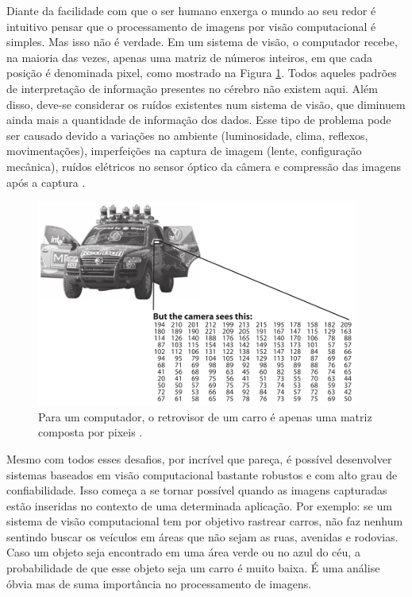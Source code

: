 Diante da facilidade com que o ser humano enxerga o mundo ao seu redor é intuitivo pensar que o processamento de imagens por visão computacional é simples. Mas isso não é verdade. Em um sistema de visão, o computador recebe, na maioria das vezes, apenas uma matriz de números inteiros, em que cada posição é denominada pixel, como mostrado na Figura \ref{fig:opencv_car}. Todos aqueles padrões de interpretação de informação presentes no cérebro não existem aqui. Além disso, deve-se considerar os ruídos existentes num sistema de visão, que diminuem ainda mais a quantidade de informação dos dados. Esse tipo de problema pode ser causado devido a variações no ambiente (luminosidade, clima, reflexos, movimentações), imperfeições na captura de imagem (lente, configuração mecânica), ruídos elétricos no sensor óptico da câmera e compressão das imagens após a captura \citep{opencv:2008:book}.

\begin{figure}[ht]
  \begin{center}
    \includegraphics{imgs/opencv_car.png}
  \end{center}
  \caption{Para um computador, o retrovisor de um carro é apenas uma matriz composta por pixeis \citep{opencv:2008:book}.}
  \label{fig:opencv_car}
\end{figure}

Mesmo com todos esses desafios, por incrível que pareça, é possível desenvolver sistemas baseados em visão computacional bastante robustos e com alto grau de confiabilidade. Isso começa a se tornar possível quando as imagens capturadas estão inseridas no contexto de uma determinada aplicação. Por exemplo: se um sistema de visão computacional tem por objetivo rastrear carros, não faz nenhum sentindo buscar os veículos em áreas que não sejam as ruas, avenidas e rodovias. Caso um objeto seja encontrado em uma área verde ou no azul do céu, a probabilidade de que esse objeto seja um carro é muito baixa. É uma análise óbvia mas de suma importância no processamento de imagens.

